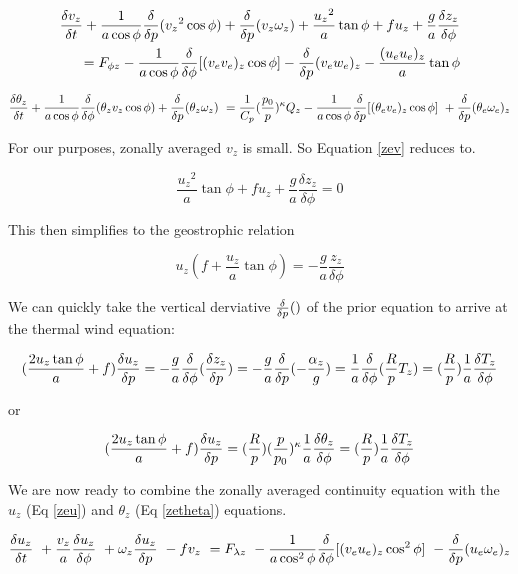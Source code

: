 \documentclass{article}
\begin{document}
\begin{eqnarray}
\frac{\delta v_z}{\delta t} + \frac{1}{a\cos{\phi}} \frac{\delta}{\delta p} ({v_z}^2 \cos \phi ) + \frac{\delta}{\delta p} (v_z \omega_z)
+ \frac{{u_z}^2}{a} \tan{\phi} +fu_z + \frac{g}{a} \frac{\delta z_z}{\delta \phi}
\\
= F_{\phi z} - \frac{1}{a\cos{\phi}} \frac{\delta}{\delta \phi} [ (v_e v_e)_z \cos \phi ]
- \frac{\delta}{\delta p} (v_e w_e)_z - \frac{(u_e u_e)_z}{a} \tan \phi
\label{zev}
\end{eqnarray}

\begin{equation}
\frac{\delta \theta_z}{\delta t} + \frac{1}{a\cos{\phi}} \frac{\delta}{\delta \phi} (\theta_z v_z \cos \phi ) + \frac{\delta}{\delta p} (\theta_z \omega_z) \
= \frac{1}{C_p} (\frac{p_0}{p})^\kappa Q_z - \frac{1}{a\cos{\phi}} \frac{\delta}{\delta p} [ (\theta_e v_e)_z \cos {\phi} ] \
+ \frac{\delta}{\delta p} (\theta_e \omega_e )_z
\label{zetheta}
\end{equation}

For our purposes, zonally averaged $v_z$ is small.  So Equation \ref{zev} reduces to.

\begin{equation}
\frac{{u_z}^2}{a} \tan{\phi} +fu_z + \frac{g}{a} \frac{\delta z_z}{\delta \phi} = 0
\end{equation}

This then simplifies to the geostrophic relation

\begin{equation}
u_z (f + \frac{u_z}{a}\tan \phi ) = - \frac{g}{a}\frac{z_z}{\delta \phi}
\end{equation}

We can quickly take the vertical derviative $\frac{\delta}{\delta p} ()$ of the prior equation to
arrive at the thermal wind equation:

\begin{equation}
(\frac{2u_z \tan{\phi}}{a} + f) \frac{\delta u_z}{\delta p} = - \frac{g}{a} \frac{\delta}{\delta \phi} (\frac{\delta z_z}{\delta p})
= - \frac{g}{a} \frac{\delta}{\delta p} (- \frac{\alpha_z}{g}) = \frac{1}{a} \frac{\delta}{\delta \phi}(\frac{R}{p} T_z) = (\frac{R}{p}) \frac{1}{a} \frac{\delta T_z}{\delta \phi}
\label{thermal}
\end{equation}

or

\begin{equation}
(\frac{2u_z \tan{\phi}}{a} + f) \frac{\delta u_z}{\delta p} = (\frac{R}{p}) (\frac{p}{p_0})^\kappa \frac{1}{a} \frac{\delta \theta_z}{\delta \phi} = (\frac{R}{p}) \frac{1}{a} \frac{\delta T_z}{\delta \phi}
\end{equation}

We are now ready to combine the zonally averaged continuity equation
with the $u_z$ (Eq \ref{zeu}) and $\theta_z$ (Eq \ref{zetheta}) equations.

\begin{equation}
\frac{\delta u_z}{\delta t} \
+ \frac{v_z}{a} \frac{\delta u_z}{\delta \phi} \
+ \omega_z \frac{\delta u_z}{\delta p} \
- fv_z \
= F_{\lambda z} \
- \frac{1}{a\cos^2{\phi}} \frac{\delta}{\delta \phi} [ ( v_e u_e )_z \cos^2 \phi ] \
- \frac{\delta}{\delta p} (u_e \omega_e )_z
\label{combineu}
\end{equation}
\end{document}
